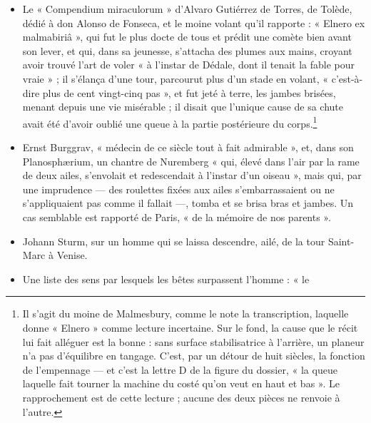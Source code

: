 \documentclass[11pt,a4paper]{article}
\begin{document}
\begin{itemize}
{    Incardanum 326.\textsuperscript{a} », c'est-à-dire l'\emph{Exercitatio} 326
    des \emph{Exercitationes} de Scaliger contre Cardan. Aucune de ces deux
    œuvres n'a été consultée, et cette lecture ne vérifie pas la citation. Deux
    mots du passage, « facillimè » et « præstiterim », et un troisième,
    « neruulis » — lequel porte trois jambages initiaux et se lirait
    littéralement « meruulis » — sont donnés comme lectures incertaines par la
    transcription.}
  \item Le « Compendium miraculorum » d'Alvaro Gutiérrez de Torres, de Tolède,
    dédié à don Alonso de Fonseca, et le moine volant qu'il rapporte : « Elnero
    ex malmabiriâ », qui fut le plus docte de tous et prédit une comète bien
    avant son lever, et qui, dans sa jeunesse, s'attacha des plumes aux mains,
    croyant avoir trouvé l'art de voler « à l'instar de Dédale, dont il tenait
    la fable pour vraie » ; il s'élança d'une tour, parcourut plus d'un stade en
    volant, « c'est-à-dire plus de cent vingt-cinq pas », et fut jeté à terre,
    les jambes brisées, menant depuis une vie misérable ; il disait que l'unique
    cause de sa chute avait été d'avoir oublié une queue à la partie postérieure
    du corps.\footnote{Il s'agit du moine de Malmesbury, comme le note la
    transcription, laquelle donne « Elnero » comme lecture incertaine. Sur le
    fond, la cause que le récit lui fait alléguer est la bonne : sans surface
    stabilisatrice à l'arrière, un planeur n'a pas d'équilibre en tangage.
    C'est, par un détour de huit siècles, la fonction de l'empennage — et c'est
    la lettre D de la figure du dossier, « la queue laquelle fait tourner la
    machine du costé qu'on veut en haut et bas ». Le rapprochement est de cette
    lecture ; aucune des deux pièces ne renvoie à l'autre.}
  \item Ernst Burggrav, « médecin de ce siècle tout à fait admirable », et, dans
    son Planosphærium, un chantre de Nuremberg « qui, élevé dans l'air par la
    rame de deux ailes, s'envolait et redescendait à l'instar d'un oiseau », mais
    qui, par une imprudence — des roulettes fixées aux ailes s'embarrassaient ou
    ne s'appliquaient pas comme il fallait —, tomba et se brisa bras et jambes.
    Un cas semblable est rapporté de Paris, « de la mémoire de nos parents ».
  \item Johann Sturm, sur un homme qui se laissa descendre, ailé, de la tour
    Saint-Marc à Venise.
  \item Une liste des sens par lesquels les bêtes surpassent l'homme : « le

\end{itemize}
\end{document}

